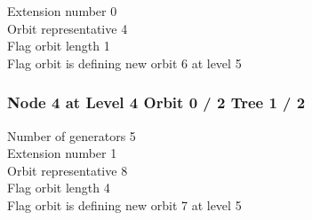 \noindent Extension number 0\\
Orbit representative 4\\
Flag orbit length 1\\
Flag orbit is defining new orbit 6 at level 5\\
\subsubsection*{Node 4 at Level 4 Orbit 0 / 2 Tree 1 / 2}
Number of generators 5\\

\noindent Extension number 1\\
Orbit representative 8\\
Flag orbit length 4\\
Flag orbit is defining new orbit 7 at level 5\\
